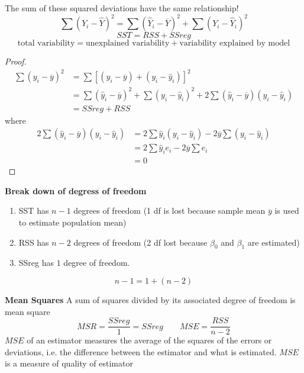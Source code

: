 \documentclass[11pt]{article}
\begin{document}
\begin{defn*}
\begin{center}
	\end{center}
	The sum of these squared deviations have the same relationship!
	\[
		\sum (Y_i - \hat{Y})^2 = \sum (\hat{Y}_i - \overline{Y})^2 + \sum (Y_i - \hat{Y}_i)^2
	\]
	\[
		SST = RSS + SSreg
	\]
	\[
		\text{total variability} =\text{unexplained variability} + \text{variability explained by model}
	\]
	\begin{proof}
		\begin{align*}
			\sum (y_i - \overline{y})^2 
			&= \sum [(\hat{y}_i - \overline{y}) + (y_i - \hat{y}_i)]^2\\ 
			&= \sum (\hat{y}_i - \overline{y})^2 + \sum (y_i - \hat{y}_i)^2 + 2\sum(\hat{y}_i - \overline{y})(y_i - \hat{y}_i)\\
			&= SSreg + RSS 
		\end{align*}
		where 
		\begin{align*}
			2\sum(\hat{y}_i - \overline{y})(y_i - \hat{y}_i) 
			&= 2\sum \hat{y}_i (y_i - \hat{y}_i) - 2\overline{y}\sum (y_i - \hat{y}_i)\\
			&= 2\sum \hat{y}_i e_i - 2\overline{y} \sum e_i \\
			&= 0
		\end{align*}
	\end{proof}
\end{defn*}

\begin{defn*}
	\textbf{Break down of degress of freedom} 
	\begin{enumerate}
		\item SST has $n-1$ degrees of freedom (1 df is lost because sample mean $\overline{y}$ is used to estimate population mean)
		\item RSS has $n-2$  degrees of freedom (2 df lost because $\beta_0$ and $\beta_1$ are estimated)
		\item SSreg has $1$ degree of freedom. 
	\end{enumerate}
	\[
		n - 1 = 1 + (n - 2)
	\]
\end{defn*}

\begin{defn*}
	\textbf{Mean Squares} A sum of squares divided by its associated degree of freedom is mean square
	\[
		MSR = \frac{SSreg}{1} = SSreg \quad \quad MSE = \frac{RSS}{n-2}
	\]
	$MSE$ of an estimator measures the average of the squares of the errors or deviations, i.e. the difference between the estimator and what is estimated. $MSE$ is a measure of quality of estimator
\end{defn*}
\end{document}
